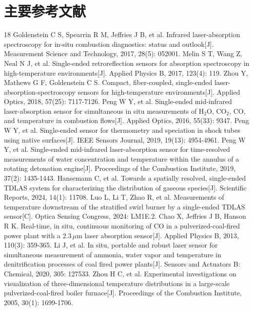 \documentclass[12pt,a4paper]{article}
\begin{document}
\section{主要参考文献}

\begin{thebibliography}{18}
\small
{} Goldenstein C S, Spearrin R M, Jeffries J B, et al. Infrared laser-absorption spectroscopy for in-situ combustion diagnostics: status and outlook[J]. Measurement Science and Technology, 2017, 28(5): 052001.
 Melin S T, Wang Z, Neal N J, et al. Single-ended retroreflection sensors for absorption spectroscopy in high-temperature environments[J]. Applied Physics B, 2017, 123(4): 119.
 Zhou Y, Mathews G F, Goldenstein C S. Compact, fiber-coupled, single-ended laser-absorption-spectroscopy sensors for high-temperature environments[J]. Applied Optics, 2018, 57(25): 7117-7126.
 Peng W Y, et al. Single-ended mid-infrared laser-absorption sensor for simultaneous in situ measurements of H$_2$O, CO$_2$, CO, and temperature in combustion flows[J]. Applied Optics, 2016, 55(33): 9347.
 Peng W Y, et al. Single-ended sensor for thermometry and speciation in shock tubes using native surfaces[J]. IEEE Sensors Journal, 2019, 19(13): 4954-4961.
 Peng W Y, et al. Single-ended mid-infrared laser-absorption sensor for time-resolved measurements of water concentration and temperature within the annulus of a rotating detonation engine[J]. Proceedings of the Combustion Institute, 2019, 37(2): 1435-1443.
 Hansemann C, et al. Towards a spatially resolved, single-ended TDLAS system for characterizing the distribution of gaseous species[J]. Scientific Reports, 2024, 14(1): 11708.
 Luo L, Li T, Zhao R, et al. Measurements of temperature downstream of the stratified swirl burner by a single-ended TDLAS sensor[C]. Optica Sensing Congress, 2024: LM1E.2.
 Chao X, Jeffries J B, Hanson R K. Real-time, in situ, continuous monitoring of CO in a pulverized-coal-fired power plant with a 2.3\,$\mu$m laser absorption sensor[J]. Applied Physics B, 2013, 110(3): 359-365.
 Li J, et al. In situ, portable and robust laser sensor for simultaneous measurement of ammonia, water vapor and temperature in denitrification processes of coal fired power plants[J]. Sensors and Actuators B: Chemical, 2020, 305: 127533.
 Zhou H C, et al. Experimental investigations on visualization of three-dimensional temperature distributions in a large-scale pulverized-coal-fired boiler furnace[J]. Proceedings of the Combustion Institute, 2005, 30(1): 1699-1706.

\end{thebibliography}
\end{document}
